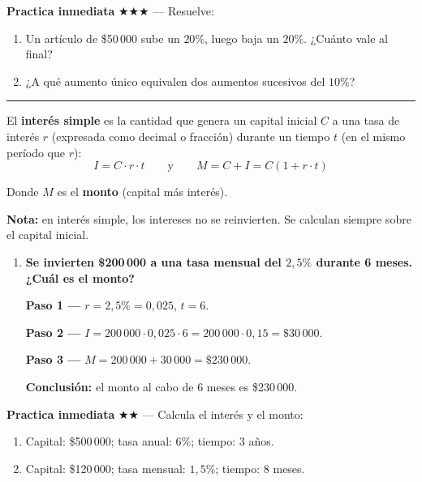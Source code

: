 \documentclass[11pt, letterpaper]{article}
\newcommand{\subbloque}[1]{%
  \vspace{14pt}
  \noindent{\large\bfseries\color{zenitnavy} #1}\par
  \vspace{4pt}\hrule height 1pt\vspace{8pt}}
\begin{document}
\medskip
\textbf{Practica inmediata} \quad $\bigstar\bigstar\bigstar$ --- Resuelve:
\begin{enumerate}[label=\alph*), leftmargin=*]
  \item Un art\'iculo de \$50\,000 sube un $20\%$, luego baja un $20\%$. ¿Cu\'anto vale al final?
  \item ¿A qu\'e aumento \'unico equivalen dos aumentos sucesivos del $10\%$?
\end{enumerate}

\subbloque{7.5 Inter\'es simple}
\label{sub:7.5}

\begin{tcolorbox}[importantbox, title={Inter\'es simple}]
El \textbf{inter\'es simple} es la cantidad que genera un capital inicial $C$ a una tasa de inter\'es $r$ (expresada como decimal o fracci\'on) durante un tiempo $t$ (en el mismo per\'iodo que $r$):
$$I = C \cdot r \cdot t \qquad\text{y}\qquad M = C + I = C(1 + r \cdot t)$$

Donde $M$ es el \textbf{monto} (capital m\'as inter\'es).

\medskip

\noindent\textbf{Nota:} en inter\'es simple, los intereses no se reinvierten. Se calculan siempre sobre el capital inicial.
\end{tcolorbox}

\begin{tcolorbox}[examplebox, title={Ejemplo --- inter\'es simple}]
\begin{enumerate}[label=\textbf{Ej. \arabic*.}, leftmargin=*, itemsep=12pt]

\item \textbf{Se invierten \$200\,000 a una tasa mensual del $2{,}5\%$ durante 6 meses. ¿Cu\'al es el monto?}

\textbf{Paso 1 ---} $r = 2{,}5\% = 0{,}025$, $t = 6$.

\textbf{Paso 2 ---} $I = 200\,000 \cdot 0{,}025 \cdot 6 = 200\,000 \cdot 0{,}15 = \$30\,000$.

\textbf{Paso 3 ---} $M = 200\,000 + 30\,000 = \$230\,000$.

\textbf{Conclusi\'on:} el monto al cabo de 6 meses es \$230\,000. \checkmark

\end{enumerate}
\end{tcolorbox}

\medskip
\textbf{Practica inmediata} \quad $\bigstar\bigstar$ --- Calcula el inter\'es y el monto:
\begin{enumerate}[label=\alph*), leftmargin=*]
  \item Capital: \$500\,000; tasa anual: $6\%$; tiempo: 3 a\~nos.
  \item Capital: \$120\,000; tasa mensual: $1{,}5\%$; tiempo: 8 meses.
\end{enumerate}
\end{document}
